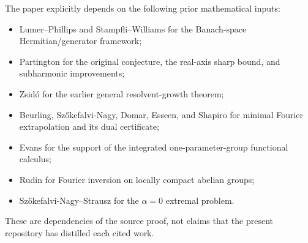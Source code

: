 The paper explicitly depends on the following prior mathematical inputs:
\begin{itemize}
\item Lumer--Phillips and Stampfli--Williams for the Banach-space Hermitian/generator framework;
\item Partington for the original conjecture, the real-axis sharp bound, and subharmonic improvements;
\item Zsid\'o for the earlier general resolvent-growth theorem;
\item Beurling, Sz\H{o}kefalvi-Nagy, Domar, Esseen, and Shapiro for minimal Fourier extrapolation and its dual certificate;
\item Evans for the support of the integrated one-parameter-group functional calculus;
\item Rudin for Fourier inversion on locally compact abelian groups;
\item Sz\H{o}kefalvi-Nagy--Strausz for the $\alpha=0$ extremal problem.
\end{itemize}
These are dependencies of the source proof, not claims that the present repository has distilled each cited work.
\endgroup


